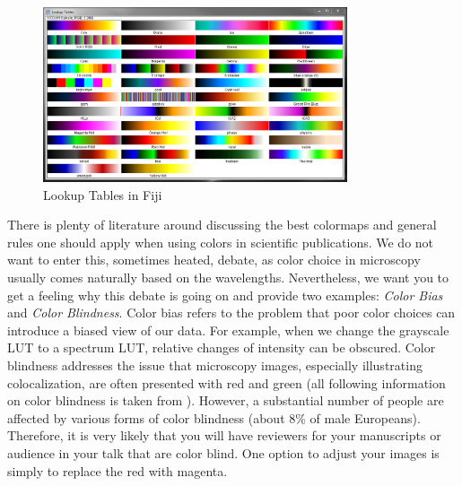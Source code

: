 \begin{figure}[!ht]
	\centering
		\includegraphics[width=0.80\textwidth]{mod1-publishing/figures/lookup-tables.png}
	\caption{Lookup Tables in Fiji}
	\label{fig:lookup-tables}
\end{figure}

There is plenty of literature around discussing the best colormaps and general rules one should apply when using colors in scientific publications. We do not want to enter this, sometimes heated, debate, as color choice in microscopy usually comes naturally based on the wavelengths. Nevertheless, we want you to get a feeling why this debate is going on and provide two examples: \emph{Color Bias} and \emph{Color Blindness}. Color bias refers to the problem that poor color choices can introduce a biased view of our data. For example, when we change the grayscale LUT to a spectrum LUT, relative changes of intensity can be obscured. Color blindness addresses the issue that microscopy images, especially illustrating colocalization, are often presented with red and green (all following information on color blindness is taken from \cite{wong2011}). However, a substantial number of people are affected by various forms of color blindness (about 8\% of male Europeans). Therefore, it is very likely that you will have reviewers for your manuscripts or audience in your talk that are color blind. One option to adjust your images is simply to replace the red with magenta.

